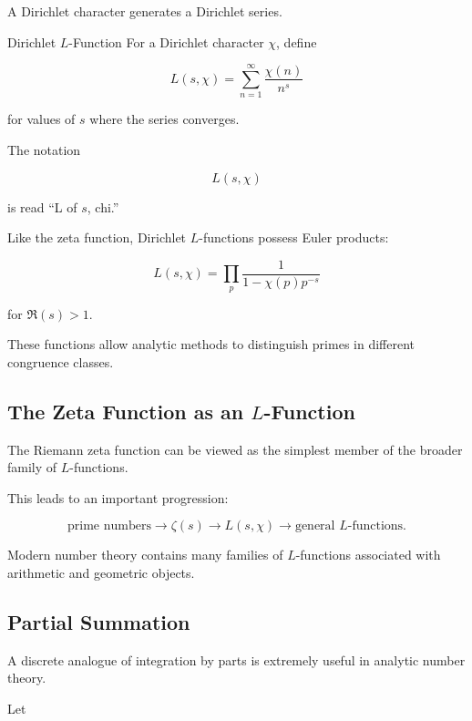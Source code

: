 A Dirichlet character generates a Dirichlet series.

\begin{definitionbox}{Dirichlet \(L\)-Function}
For a Dirichlet character \(\chi\), define

\[ \boxed{L(s,\chi)=\sum_{n=1}^{\infty}\frac{\chi(n)}{n^s}} \]

for values of \(s\) where the series converges.
\end{definitionbox}

The notation

\[ L(s,\chi) \]

is read ``L of \(s\), chi.''

Like the zeta function, Dirichlet \(L\)-functions possess Euler products:

\[ \boxed{L(s,\chi)=\prod_p\frac{1}{1-\chi(p)p^{-s}}} \]

for \(\Re(s)>1\).

These functions allow analytic methods to distinguish primes in different
congruence classes.

\subsection{The Zeta Function as an \(L\)-Function}
\label{subsec:zeta-as-l-function}

The Riemann zeta function can be viewed as the simplest member of the broader
family of \(L\)-functions.

This leads to an important progression:

\[
\boxed{
\text{prime numbers}
\longrightarrow
\zeta(s)
\longrightarrow
L(s,\chi)
\longrightarrow
\text{general }L\text{-functions}.
}
\]

Modern number theory contains many families of \(L\)-functions associated
with arithmetic and geometric objects.

\subsection{Partial Summation}
\label{subsec:partial-summation}

A discrete analogue of integration by parts is extremely useful in analytic
number theory.

Let

